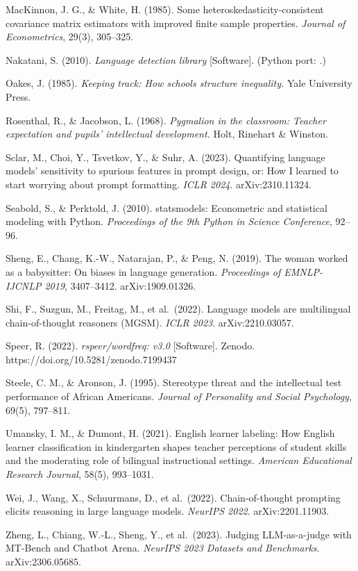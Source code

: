 \documentclass[
]{article}
\let\oldtexttt\texttt
\renewcommand{\texttt}[1]{\oldtexttt{\seqsplit{#1}}}
\begin{document}
MacKinnon, J. G., \& White, H. (1985). Some
heteroskedasticity-consistent covariance matrix estimators with improved
finite sample properties. \emph{Journal of Econometrics}, 29(3),
305--325.

Nakatani, S. (2010). \emph{Language detection library} {[}Software{]}.
(Python port: \texttt{langdetect}.)

Oakes, J. (1985). \emph{Keeping track: How schools structure
inequality.} Yale University Press.

Rosenthal, R., \& Jacobson, L. (1968). \emph{Pygmalion in the classroom:
Teacher expectation and pupils' intellectual development.} Holt,
Rinehart \& Winston.

Sclar, M., Choi, Y., Tsvetkov, Y., \& Suhr, A. (2023). Quantifying
language models' sensitivity to spurious features in prompt design, or:
How I learned to start worrying about prompt formatting. \emph{ICLR
2024}. arXiv:2310.11324.

Seabold, S., \& Perktold, J. (2010). statsmodels: Econometric and
statistical modeling with Python. \emph{Proceedings of the 9th Python in
Science Conference}, 92--96.

Sheng, E., Chang, K.-W., Natarajan, P., \& Peng, N. (2019). The woman
worked as a babysitter: On biases in language generation.
\emph{Proceedings of EMNLP-IJCNLP 2019}, 3407--3412. arXiv:1909.01326.

Shi, F., Suzgun, M., Freitag, M., et al.~(2022). Language models are
multilingual chain-of-thought reasoners (MGSM). \emph{ICLR 2023}.
arXiv:2210.03057.

Speer, R. (2022). \emph{rspeer/wordfreq: v3.0} {[}Software{]}. Zenodo.
https://doi.org/10.5281/zenodo.7199437

Steele, C. M., \& Aronson, J. (1995). Stereotype threat and the
intellectual test performance of African Americans. \emph{Journal of
Personality and Social Psychology}, 69(5), 797--811.

Umansky, I. M., \& Dumont, H. (2021). English learner labeling: How
English learner classification in kindergarten shapes teacher
perceptions of student skills and the moderating role of bilingual
instructional settings. \emph{American Educational Research Journal},
58(5), 993--1031.

Wei, J., Wang, X., Schuurmans, D., et al.~(2022). Chain-of-thought
prompting elicits reasoning in large language models. \emph{NeurIPS
2022}. arXiv:2201.11903.

Zheng, L., Chiang, W.-L., Sheng, Y., et al.~(2023). Judging
LLM-as-a-judge with MT-Bench and Chatbot Arena. \emph{NeurIPS 2023
Datasets and Benchmarks}. arXiv:2306.05685.
\end{document}
